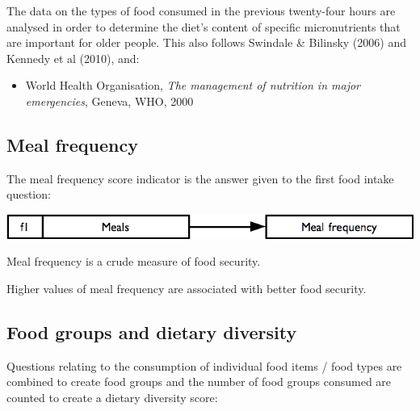 \documentclass[12pt,a4paper]{book}
\providecommand{\tightlist}{%
  \setlength{\itemsep}{0pt}\setlength{\parskip}{0pt}}
\theoremstyle{definition}
\theoremstyle{definition}
\theoremstyle{definition}
\theoremstyle{remark}
\begin{document}
The data on the types of food consumed in the previous twenty-four hours
are analysed in order to determine the diet's content of specific
micronutrients that are important for older people. This also follows
Swindale \& Bilinsky (2006) and Kennedy et al (2010), and:

\begin{itemize}
\tightlist
\item
  World Health Organisation, \emph{The management of nutrition in major
  emergencies}, Geneva, WHO, 2000
\end{itemize}

\hypertarget{meal-frequency}{%
\subsection{Meal frequency}\label{meal-frequency}}

The meal frequency score indicator is the answer given to the first food
intake question:

\begin{center}\includegraphics[width=9.76in]{figures/indicators05} \end{center}

Meal frequency is a crude measure of food security.

Higher values of meal frequency are associated with better food
security.

\hypertarget{food-groups-and-dietary-diversity}{%
\subsection{Food groups and dietary
diversity}\label{food-groups-and-dietary-diversity}}

Questions relating to the consumption of individual food items / food
types are combined to create food groups and the number of food groups
consumed are counted to create a dietary diversity score:
\end{document}
